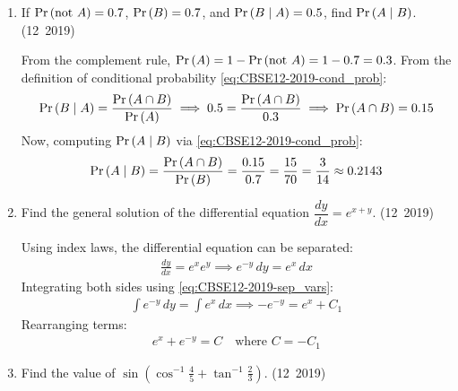 \begin{enumerate}[label=\thesubsection.\arabic*, ref=\thesubsection.\theenumi]
\item If $\Pr\left(\text{not } A\right) = 0.7$, $\Pr\left(B\right) = 0.7$, and $\Pr\left(B \mid A\right) = 0.5$, find $\Pr\left(A \mid B\right)$.
\hfill (12~2019)

\solution
From the complement rule, $\Pr\left(A\right) = 1 - \Pr\left(\text{not } A\right) = 1 - 0.7 = 0.3$.
From the definition of conditional probability \eqref{eq:CBSE12-2019-cond_prob}:
\begin{align}
	\Pr\left(B \mid A\right) = \frac{\Pr\left(A \cap B\right)}{\Pr\left(A\right)} \implies 0.5 = \frac{\Pr\left(A \cap B\right)}{0.3} \implies \Pr\left(A \cap B\right) = 0.15
\end{align}
Now, computing $\Pr\left(A \mid B\right)$ via \eqref{eq:CBSE12-2019-cond_prob}:
\begin{align}
	\Pr\left(A \mid B\right) = \frac{\Pr\left(A \cap B\right)}{\Pr\left(B\right)} = \frac{0.15}{0.7} = \frac{15}{70} = \frac{3}{14} \approx 0.2143
\end{align}


\item Find the general solution of the differential equation $\dfrac{dy}{dx} = e^{x+y}$.
\hfill (12~2019)

\solution
Using index laws, the differential equation can be separated:
\begin{align}
	\frac{dy}{dx} = e^x e^y \implies e^{-y}\,dy = e^x\,dx
\end{align}
Integrating both sides using \eqref{eq:CBSE12-2019-sep_vars}:
\begin{align}
	\int e^{-y}\,dy = \int e^x\,dx \implies -e^{-y} = e^x + C_1
\end{align}
Rearranging terms:
\begin{align}
	e^x + e^{-y} = C \quad \text{where } C = -C_1
\end{align}


\item Find the value of $\sin\left(\cos^{-1}\frac{4}{5} + \tan^{-1}\frac{2}{3}\right)$.
\hfill (12~2019)


\end{enumerate}
